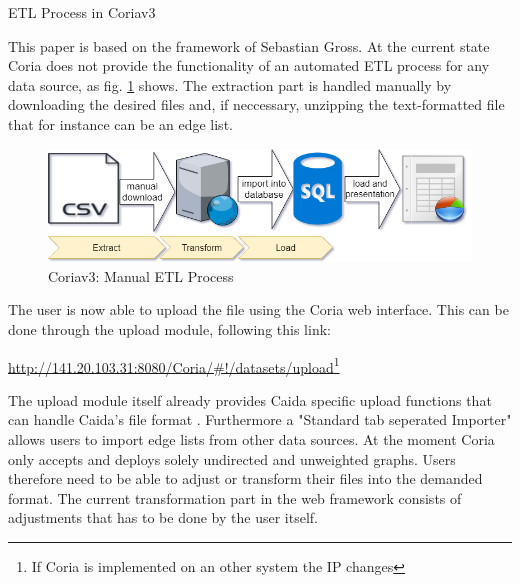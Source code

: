 \documentclass[conference, 11pt]{IEEEtran}
\begin{document}
\begin{subsection}{ETL Process in Coriav3}

This paper is based on the framework of Sebastian Gross\cite{Coria3}. At the current state Coria does not provide the functionality of an automated ETL process for any data source, as fig. \ref{fig:ETLinCoriav3} shows. 
The extraction part is handled manually by downloading the desired files and, if neccessary, unzipping the text-formatted file that for instance can be an edge list. \\ \linebreak


\vspace{0.3cm}
\begin{figure}[htbp]
\centerline{\includegraphics[width=\columnwidth]{Graphics/CoriaETL_current.png}}
\caption{Coriav3: Manual ETL Process}
\label{fig:ETLinCoriav3}
\end{figure}
\vspace{0.3cm}

The user is now able to upload the file using the Coria web interface. This can be done through the upload module, following this link: \begin{center} \url{http://141.20.103.31:8080/Coria/#!/datasets/upload}\footnote{If Coria is implemented on an other system the IP changes} \end{center} The upload module itself already provides Caida specific upload functions that can handle Caida's file format \cite{Coria3}. Furthermore a "Standard tab seperated Importer" allows users to import edge lists from other data sources. At the moment Coria only accepts and deploys solely undirected and unweighted graphs. Users therefore need to be able to adjust or transform their files into the demanded format. The current transformation part in the web framework consists of adjustments that has to be done by the user itself.\linebreak


\end{subsection}
\end{document}
